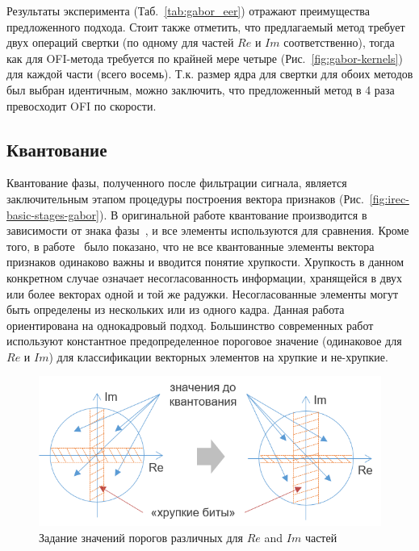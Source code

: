 Результаты эксперимента (Таб.~\ref{tab:gabor_eer}) отражают преимущества предложенного подхода. Стоит также отметить, что предлагаемый метод требует двух операций свертки (по одному для частей $Re$ и $Im$ соответственно), тогда как для OFI-метода требуется по крайней мере четыре (Рис.~\ref{fig:gabor-kernels}) для каждой части (всего восемь). Т.к. размер ядра для свертки для обоих методов был выбран идентичным, можно заключить, что предложенный метод в 4 раза превосходит OFI по скорости.

\subsection{Квантование}
\label{sec:quantization}

Квантование фазы, полученного после фильтрации сигнала, является заключительным этапом процедуры построения вектора признаков (Рис.~\ref{fig:irec-basic-stages-gabor}). В оригинальной работе квантование производится в зависимости от знака фазы~\cite{daugman_1993}, и все элементы используются для сравнения. Кроме того, в работе~\cite{hollingsworth_2009} было показано, что не все квантованные элементы вектора признаков одинаково важны и вводится понятие хрупкости. Хрупкость в данном конкретном случае означает несогласованность информации, хранящейся в двух или более векторах одной и той же радужки. Несогласованные элементы могут быть определены из нескольких или из одного кадра. Данная работа ориентирована на однокадровый подход. Большинство современных работ~\cite{lee_2013,hollingsworth_2009} используют константное предопределенное пороговое значение (одинаковое для $Re$ и $Im$) для классификации векторных элементов на хрупкие и не-хрупкие.

\begin{figure}[h]
	\begin{center}
		\includegraphics[width=0.75\columnwidth]{pictures/re_im_different_ths.png}
		\caption{Задание значений порогов различных для $Re$ and $Im$ частей}
		\label{fig:re_im_different_ths}
	\end{center}
\end{figure}

